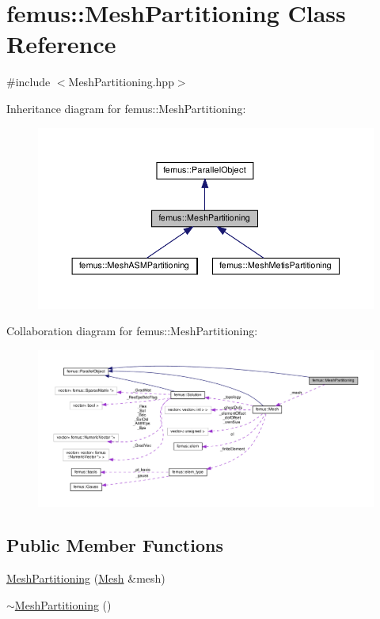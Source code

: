 \hypertarget{classfemus_1_1_mesh_partitioning}{}\section{femus\+:\+:Mesh\+Partitioning Class Reference}
\label{classfemus_1_1_mesh_partitioning}


{\ttfamily \#include $<$Mesh\+Partitioning.\+hpp$>$}



Inheritance diagram for femus\+:\+:Mesh\+Partitioning\+:
\nopagebreak
\begin{figure}[H]
\begin{center}
\leavevmode
\includegraphics[width=350pt]{classfemus_1_1_mesh_partitioning__inherit__graph}
\end{center}
\end{figure}


Collaboration diagram for femus\+:\+:Mesh\+Partitioning\+:
\nopagebreak
\begin{figure}[H]
\begin{center}
\leavevmode
\includegraphics[width=350pt]{classfemus_1_1_mesh_partitioning__coll__graph}
\end{center}
\end{figure}
\subsection*{Public Member Functions}
\begin{DoxyCompactItemize}
\item 
\mbox{\hyperlink{classfemus_1_1_mesh_partitioning_ab696b03d5a62ffae63e70edd0b5b0617}{Mesh\+Partitioning}} (\mbox{\hyperlink{classfemus_1_1_mesh}{Mesh}} \&mesh)
\item 
\mbox{\hyperlink{classfemus_1_1_mesh_partitioning_ad084882a08206ab78da52adaef56d7c6}{$\sim$\+Mesh\+Partitioning}} ()
\end{DoxyCompactItemize}
